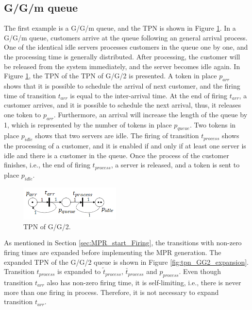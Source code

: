 \documentclass[suppldata]{interact}
\theoremstyle{plain}
\theoremstyle{definition}
\theoremstyle{remark}
\begin{document}
\subsection{G/G/m queue}\label{sec:TPN_ggm}
The first example is a G/G/m queue, and the TPN is shown in Figure \ref{fig:tpn_GG2}. In a G/G/m queue, customers arrive at the queue following an general arrival process. One of the identical idle servers processes customers in the queue one by one, and the processing time is generally distributed. After processing, the customer will be released from the system immediately, and the server becomes idle again. In Figure \ref{fig:tpn_GG2}, the TPN of the TPN of G/G/2 is presented. A token in place $p_{arr}$ shows that it is possible to schedule the arrival of next customer, and the firing time of transition $t_{arr}$ is equal to the inter-arrival time. At the end of firing $t_{arr}$, a customer arrives, and it is possible to schedule the next arrival, thus, it releases one token to $p_{arr}$. Furthermore, an arrival will increase the length of the queue by 1, which is represented by the number of tokens in place $p_{queue}$. Two tokens in place $p_{idle}$ shows that two servers are idle. The firing of transition $t_{process}$ shows the processing of a customer, and it is enabled if and only if at least one server is idle and there is a customer in the queue. Once the process of the customer finishes, i.e., the end of firing $t_{process}$, a server is released, and a token is sent to place $p_{idle}$.

\begin{figure}[h]
	\centering
	\includegraphics[width=0.45\textwidth]{Figures/TPN-GG2.png}
	\caption{TPN of G/G/2.}
	\label{fig:tpn_GG2}
\end{figure}

As mentioned in Section \ref{sec:MPR_start_Firing}, the transitions with non-zero firing times are expanded before implementing the MPR generation. The expanded TPN of the G/G/2 queue is shown in Figure \ref{fig:tpn_GG2_expansion}. Transition $t_{process}$ is expanded to $\tilde{t}_{process}$, $\bar{t}_{process}$ and $p_{process}$. Even though transition $t_{arr}$ also has non-zero firing time, it is self-limiting, i.e., there is never more than one firing in process. Therefore, it is not necessary to expand transition $t_{arr}$.
\end{document}
